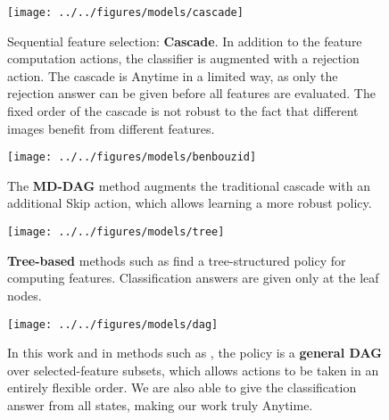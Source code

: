 \begin{figure}[H]
\centering
\texttt{[image: ../../figures/models/cascade]}
\caption[Sequential feature selection: cascade models]{
Sequential feature selection: \textbf{Cascade}.
In addition to the feature computation actions, the classifier is augmented with a rejection action.
The cascade is Anytime in a limited way, as only the rejection answer can be given before all features are evaluated.
The fixed order of the cascade is not robust to the fact that different images benefit from different features.
}\label{fig:model_cascade}
\end{figure}

\begin{figure}[H]
\centering
\texttt{[image: ../../figures/models/benbouzid]}
\caption[Sequential feature selection: Markov Decision DAG]{
The \textbf{MD-DAG} method \parencite{Benbouzid-ICML-2012} augments the traditional cascade with an additional Skip action, which allows learning a more robust policy.
}\label{fig:model_mddag}
\end{figure}

\begin{figure}[H]
\centering
\texttt{[image: ../../figures/models/tree]}
\caption[Sequential feature selection: tree-based]{
\textbf{Tree-based} methods such as \cite{Xu-ICML-2012} find a tree-structured policy for computing features.
Classification answers are given only at the leaf nodes.
}\label{fig:model_tree}
\end{figure}

\begin{figure}[H]
\texttt{[image: ../../figures/models/dag]}
\caption[Sequential feature selection: general DAG]{
In this work and in methods such as \cite{Gao-NIPS-2011}, the policy is a \textbf{general DAG} over selected-feature subsets, which allows actions to be taken in an entirely flexible order.
We are also able to give the classification answer from all states, making our work truly Anytime.
}\label{fig:model_dag}
\end{figure}
